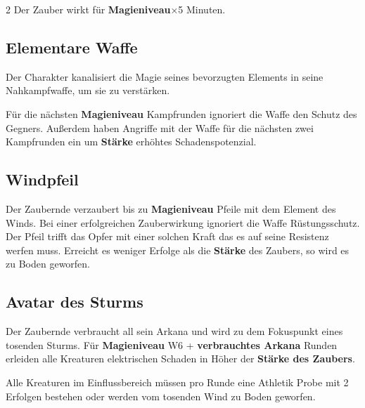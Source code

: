 \begin{multicols*}{2}
Der Zauber wirkt für \textbf{Magieniveau}×5 Minuten.



\subsection{Elementare Waffe}

Der Charakter kanalisiert die Magie seines bevorzugten Elements in seine Nahkampfwaffe, um sie zu verstärken.

Für die nächsten \textbf{Magieniveau} Kampfrunden ignoriert die Waffe den Schutz des Gegners. Außerdem haben Angriffe mit der Waffe für die nächsten zwei Kampfrunden ein um \textbf{Stärke} erhöhtes Schadenspotenzial.



\subsection{Windpfeil}

Der Zaubernde verzaubert bis zu \textbf{Magieniveau} Pfeile mit dem Element des Winds. Bei einer erfolgreichen Zauberwirkung ignoriert die Waffe Rüstungsschutz. Der Pfeil trifft das Opfer mit einer solchen Kraft das es auf seine Resistenz werfen muss. Erreicht es weniger Erfolge als die \textbf{Stärke} des Zaubers, so wird es zu Boden geworfen.



\subsection{Avatar des Sturms}

Der Zaubernde verbraucht all sein Arkana und wird zu dem Fokuspunkt eines tosenden Sturms. Für \textbf{Magieniveau} W6 + \textbf{verbrauchtes Arkana} Runden erleiden alle Kreaturen elektrischen Schaden in Höher der \textbf{Stärke des Zaubers}.

Alle Kreaturen im Einflussbereich müssen pro Runde eine Athletik Probe mit 2 Erfolgen bestehen oder werden vom tosenden Wind zu Boden geworfen.




\end{multicols*}
